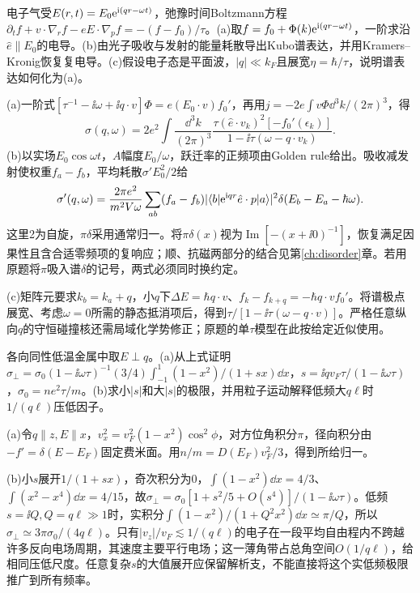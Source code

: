 \begin{exercise}[原题1(a)--(c)]\label{p:512-4-1}
电子气受$E(r,t)=E_0\mathrm e^{\mathrm i(qr-\omega t)}$，弛豫时间Boltzmann方程$\partial_tf+v\cdot\nabla_rf-eE\cdot\nabla_pf=-(f-f_0)/\tau$。(a)取$f=f_0+\Phi(k)\mathrm e^{\mathrm i(qr-\omega t)}$，一阶求沿$\hat e\parallel E_0$的电导。(b)由光子吸收与发射的能量耗散导出Kubo谱表达，并用Kramers--Kronig恢复复电导。(c)假设电子态是平面波，$|q|\ll k_F$且展宽$\eta=\hbar/\tau$，说明谱表达如何化为(a)。
\end{exercise}
\begin{solution}
(a)一阶式$[\tau^{-1}-\ii\omega+\ii q\cdot v]\Phi=e(E_0\cdot v)f_0'$，再用$j=-2e\int v\Phi\dd^3k/(2\pi)^3$，得
\begin{equation}
\sigma(q,\omega)=2e^2\int\frac{\dd^3k}{(2\pi)^3}\frac{\tau(\hat e\cdot v_k)^2[-f_0'(\epsilon_k)]}{1-\ii\tau(\omega-q\cdot v_k)}.
\end{equation}
(b)以实场$E_0\cos\omega t$，$A$幅度$E_0/\omega$，跃迁率的正频项由Golden rule给出。吸收减发射使权重$f_a-f_b$，平均耗散$\sigma'E_0^2/2$给
\begin{equation}
\sigma'(q,\omega)=\frac{2\pi e^2}{m^2V\omega}\sum_{ab}(f_a-f_b)|\langle b|\mathrm e^{\mathrm i qr}\hat e\cdot p|a\rangle|^2\delta(E_b-E_a-\hbar\omega).
\end{equation}
这里2为自旋，$\pi\delta$采用通常归一。将$\pi\delta(x)$视为$\operatorname{Im}[-(x+\ii0)^{-1}]$，恢复满足因果性且含合适零频项的复响应；顺、抗磁两部分的结合见第\ref{ch:disorder}章。若用原题将$\pi$吸入谱$\delta$的记号，两式必须同时换约定。

(c)矩阵元要求$k_b=k_a+q$，小$q$下$\Delta E=\hbar q\cdot v$、$f_k-f_{k+q}=-\hbar q\cdot v f_0'$。将谱极点展宽、考虑$\omega=0$所需的静态抵消项后，得到$\tau/[1-\ii\tau(\omega-q\cdot v)]$。严格任意纵向$q$的守恒碰撞核还需局域化学势修正；原题的单$\tau$模型在此按给定近似使用。
\end{solution}
\begin{exercise}[原题2(a)--(b)]\label{p:512-4-2}
各向同性低温金属中取$E\perp q$。(a)从上式证明$\sigma_\perp=\sigma_0(1-\ii\omega\tau)^{-1}(3/4)\int_{-1}^1(1-x^2)/(1+sx)\dd x$，$s=\ii qv_F\tau/(1-\ii\omega\tau)$，$\sigma_0=ne^2\tau/m$。(b)求小$|s|$和大$|s|$的极限，并用粒子运动解释低频大$q\ell$时$1/(q\ell)$压低因子。
\end{exercise}
\begin{solution}
(a)令$q\parallel z,E\parallel x$，$v_x^2=v_F^2(1-x^2)\cos^2\phi$，对方位角积分$\pi$，径向积分由$-f'=\delta(E-E_F)$固定费米面。用$n/m=D(E_F)v_F^2/3$，得到所给归一。

(b)小$s$展开$1/(1+sx)$，奇次积分为0，$\int(1-x^2)\dd x=4/3$、$\int(x^2-x^4)\dd x=4/15$，故$\sigma_\perp=\sigma_0[1+s^2/5+O(s^4)]/(1-\ii\omega\tau)$。低频$s=\ii Q,Q=q\ell\gg1$时，实积分$\int(1-x^2)/(1+Q^2x^2)\dd x\simeq\pi/Q$，所以$\sigma_\perp\simeq3\pi\sigma_0/(4q\ell)$。只有$|v_z|/v_F\lesssim1/(q\ell)$的电子在一段平均自由程内不跨越许多反向电场周期，其速度主要平行电场；这一薄角带占总角空间$O(1/q\ell)$，给相同压低尺度。任意复杂$s$的大值展开应保留解析支，不能直接将这个实低频极限推广到所有频率。
\end{solution}
